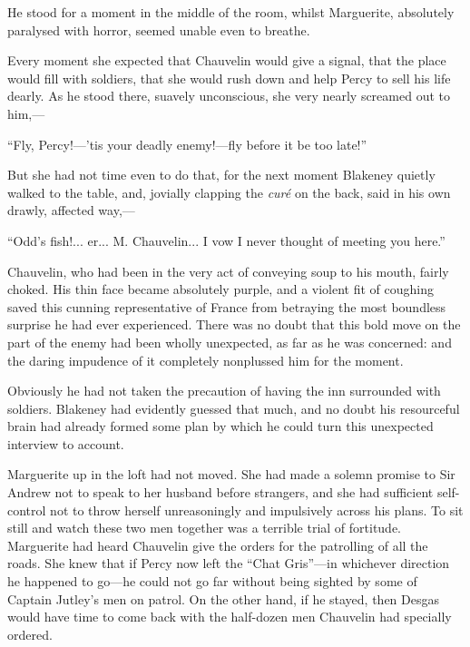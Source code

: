 He stood for a moment in the middle of the room, whilst Marguerite, absolutely paralysed with horror, seemed unable even to breathe.

Every moment she expected that Chauvelin would give a signal, that the place would fill with soldiers, that she would rush down and help Percy to sell his life dearly. As he stood there, suavely unconscious, she very nearly screamed out to him,---

\enquote{Fly, Percy!---’tis your deadly enemy!---fly before it be too late!}

But she had not time even to do that, for the next moment Blakeney quietly walked to the table, and, jovially clapping the \textit{curé} on the back, said in his own drawly, affected way,---

\enquote{Odd's fish!... er... M. Chauvelin... I vow I never thought of meeting you here.}

Chauvelin, who had been in the very act of conveying soup to his mouth, fairly choked. His thin face became absolutely purple, and a violent fit of coughing saved this cunning representative of France from betraying the most boundless surprise he had ever experienced. There was no doubt that this bold move on the part of the enemy had been wholly unexpected, as far as he was concerned: and the daring impudence of it completely nonplussed him for the moment.

Obviously he had not taken the precaution of having the inn surrounded with soldiers. Blakeney had evidently guessed that much, and no doubt his resourceful brain had already formed some plan by which he could turn this unexpected interview to account.

Marguerite up in the loft had not moved. She had made a solemn promise to Sir Andrew not to speak to her husband before strangers, and she had sufficient self-control not to throw herself unreasoningly and impulsively across his plans. To sit still and watch these two men together was a terrible trial of fortitude. Marguerite had heard Chauvelin give the orders for the patrolling of all the roads. She knew that if Percy now left the \enquote{Chat Gris}---in whichever direction he happened to go---he could not go far without being sighted by some of Captain Jutley's men on patrol. On the other hand, if he stayed, then Desgas would have time to come back with the half-dozen men Chauvelin had specially ordered.

